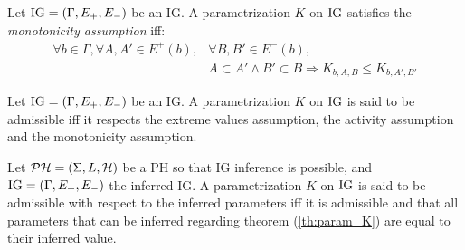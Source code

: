 \begin{property}
\label{prop:param_enum_monotonicity}
Let $\mathrm{IG} = (\Gamma, E_+, E_-)$ be an IG. A parametrization $K$ on $\mathrm{IG}$ satisfies the \emph{monotonicity assumption} iff:
\begin{align*}
  \forall b \in \Gamma, \forall A, A' \in E^+(b), &\forall B, B' \in E^-(b),
\\
  &A \subset A' \wedge B' \subset B \Rightarrow K_{b,A,B} \leq K_{b,A',B'}
\end{align*}
\end{property}

\begin{definition}
\label{def:param_enum}
Let $\mathrm{IG} = (\Gamma, E_+, E_-)$ be an IG. A parametrization $K$ on $\mathrm{IG}$ is said to be admissible iff it respects the extreme values assumption, the activity assumption and the monotonicity assumption.
\end{definition}

\begin{definition}
\label{def:param_enum_inf}
Let $\mathcal{PH} = (\Sigma, L, \mathcal{H})$ be a PH so that IG inference is possible, and $\mathrm{IG} = (\Gamma, E_+, E_-)$ the inferred IG. A parametrization $K$ on $\mathrm{IG}$ is said to be admissible with respect to the inferred parameters iff it is admissible and that all parameters that can be inferred regarding theorem (\ref{th:param_K}) are equal to their inferred value.
\end{definition}

\newcommand{\ti}[1]{\texttt{\textit{#1}}}
\newcommand{\aspil}[1]{\texttt{#1}}
\newcommand{\asp}[1]{\begin{itemize} \item[] \aspil{#1} \end{itemize}}

